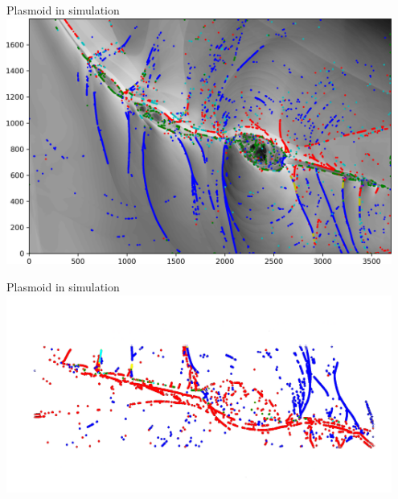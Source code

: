 \documentclass[10pt,aspectratio=169,usenames,dvipsnames]{beamer}
\begin{document}
\begin{frame}{Plasmoid in simulation}
\includegraphics[width=0.95\textwidth]{2023NAM/Figures/shocks69.png}
\end{frame}


\begin{frame}{Plasmoid in simulation}
\includegraphics[width=0.95\textwidth]{2023NAM/Figures/plasmoid.png}
\end{frame}
\end{document}
